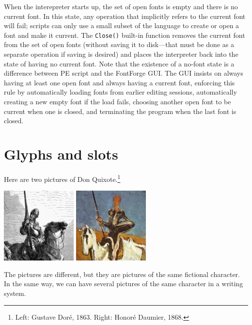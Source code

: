 When the interepreter starts up, the set of open fonts is empty and there is
no current font.  In this state, any operation that implicitly refers to the
current font will fail; scripts can only use a small subset of the language
to create or open a font and make it current.  The \texttt{Close()} built-in
function removes the current font from the set of open fonts (without saving
it to disk---that must be done as a separate operation if saving is desired)
and places the interpreter back into the state of having no current font. 
Note that the existence of a no-font state is a difference between PE script
and the FontForge GUI.  The GUI insists on always having at least one open
font and always having a current font, enforcing this rule by automatically
loading fonts from earlier editing sessions, automatically creating a new
empty font if the load fails, choosing another open font to be current when
one is closed, and terminating the program when the last font is closed.

\section{Glyphs and slots}

Here are two pictures of Don Quixote.\footnote{Left: Gustave
Dor\'{e}, 1863.  Right: Honor\'{e} Daumier, 1868.}

\begin{center}
\includegraphics[width=1.5in]{quixote-dore.jpg}\qquad
\includegraphics[width=1.5in]{quixote-daumier.jpg}
\end{center}

The pictures are different, but they are pictures of the same fictional
character.  In the same way, we can have several pictures of the same
character in a writing system.

